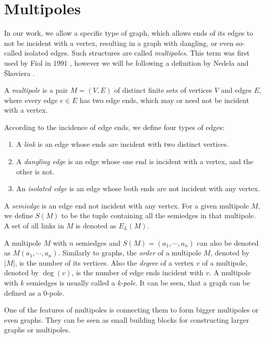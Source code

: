 \documentclass[12pt, twoside]{book}
\begin{document}
\section{Multipoles}\label{sec:multipoles}

In our work, we allow a specific type of graph, which allows ends of its edges to not be incident with a vertex, resulting in a graph with dangling, or even so-called isolated edges. Such structures are called \textit{multipoles}. This term was first used by Fiol in 1991 \cite{Fiol1991}, however we will be following a definition by Nedela and Škoviera \cite{Nedela1996}.

\begin{definition}
	A \textit{multipole} is a pair $M=(V,E)$ of distinct finite sets of vertices $V$ and edges $E$, where every edge $e\in E$ has two edge ends, which may or need not be incident with a vertex.
	
	According to the incidence of edge ends, we define four types of edges:
	\begin{enumerate}[nolistsep]
		\item A \textit{link} is an edge whose ends are incident with two distinct vertices.
		\item A \textit{dangling edge} is an edge whose one end is incident with a vertex, and the other is not.
		\item An \textit{isolated edge} is an edge whose both ends are not incident with any vertex.
	\end{enumerate}
\end{definition}

A \textit{semiedge} is an edge end not incident with any vertex. For a given multipole $M$, we define $S(M)$ to be the tuple containing all the semiedges in that multipole. A set of all links in $M$ is denoted as $E_L(M)$.

A multipole $M$ with $n$ semiedges and $S(M) = (a_1, \cdots, a_n)$ can also be denoted as $M(a_1,\cdots,a_n)$. Similarly to graphs, the \textit{order} of a multipole $M$, denoted by $|M|$, is the number of its vertices. Also the \textit{degree} of a vertex $v$ of a multipole, denoted by $\deg(v)$, is the number of edge ends incident with $v$. A multipole with $k$ semiedges is usually called a \textit{k-pole}. It can be seen, that a graph can be defined as a 0-pole.

One of the features of multipoles is connecting them to form bigger multipoles or even graphs. They can be seen as small building blocks for constructing larger graphs or multipoles. 
\end{document}

